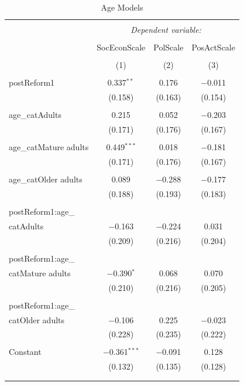 \documentclass[12pt,letterpaper]{article}
\begin{document}
\begin{enumerate}
\begin{table}[H]
	\centering
	\caption{Age Models}
	\label{tab:age_models}
	\begin{tabular}{@{\extracolsep{5pt}}p{2.5cm}ccc}
		\hline \hline
		\\[-1.8ex]
		& \multicolumn{3}{c}{\textit{Dependent variable:}} \\
		\cline{2-4}
		\\[-1.8ex]
		& SocEconScale & PolScale & PosActScale \\
		\\[-1.8ex]
		& (1) & (2) & (3)\\
		\hline
		\\[-1.8ex]
		postReform1 & 0.337$^{**}$ & 0.176 & $-$0.011 \\
		& (0.158) & (0.163) & (0.154) \\
		\\
		age\_catAdults & 0.215 & 0.052 & $-$0.203 \\
		& (0.171) & (0.176) & (0.167) \\
		\\
		age\_catMature adults & 0.449$^{***}$ & 0.018 & $-$0.181 \\
		& (0.171) & (0.176) & (0.167) \\
		\\
		age\_catOlder adults & 0.089 & $-$0.288 & $-$0.177 \\
		& (0.188) & (0.193) & (0.183) \\
		\\
		postReform1:age\_\\catAdults & $-$0.163 & $-$0.224 & 0.031 \\
		& (0.209) & (0.216) & (0.204) \\
		\\
		postReform1:age\_\\catMature adults & $-$0.390$^{*}$ & 0.068 & 0.070 \\
		& (0.210) & (0.216) & (0.205) \\
		\\
		postReform1:age\_\\catOlder adults & $-$0.106 & 0.225 & $-$0.023 \\
		& (0.228) & (0.235) & (0.222) \\
		\\
		Constant & $-$0.361$^{***}$ & $-$0.091 & 0.128 \\
		& (0.132) & (0.135) & (0.128) \\
		\\
		\hline
		\\[-1.8ex]

\end{tabular}
\end{table}
\end{enumerate}
\end{document}
